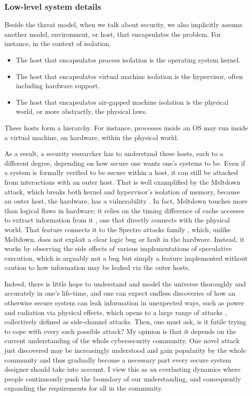 \documentclass[10pt]{article}
\begin{document}
\subsubsection{Low-level system details} \label{sec.low.level}
Beside the threat model, when we talk about security, we also implicitly assume
another model, environment, or host, that encapsulates the problem. For
instance, in the context of isolation, 
\begin{itemize}
	\item The host that encapsulates process isolation is the operating system
		kernel.
	\item The host that encapsulates virtual machine isolation is the
		hypervisor, often including hardware support.
	\item The host that encapsulates air-gapped machine isolation is the
		physical world, or more abstractly, the physical laws.
\end{itemize} 
These hosts form a hierarchy. For instance, processes inside an OS may run
inside a virtual machine, on hardware, within the physical world.

As a result, a security researcher has to understand these hosts, each to a
different degree, depending on how secure one wants one's systems to be. Even if
a system is formally verified to be secure within a host, it can still be
attacked from interactions with an outer host. That is well examplified by
the Meltdown attack, which breaks both kernel and hypervisor's isolation of
memory, because an outer host, the hardware, has a vulnerability
\cite{meltdown}. In fact, Meltdown touches more than logical flaws in hardware;
it relies on the timing difference of cache accesses to extract information
from it \cite{flush.reload}, one that directly connects with the physical
world. That feature connects it to the Spectre attacks family \cite{spectre},
which, unlike Meltdown, does not exploit a clear logic bug or fault in the
hardware. Instead, it works by observing the side effects of various
implementations of speculative execution, which is arguably not a bug but
simply a feature implemented without caution to how information may be leaked
via the outer hosts.

Indeed, there is little hope to understand and model the universe thoroughly
and accurately in one's life-time, and one can expect endless discoveries of
how an otherwise secure system can leak information in unexpected ways, such as
power and radiation via physical effects, which opens to a large range of
attacks \cite{side.channel.1, side.channel.2, side.channel.3, flush.reload},
collectively defined as side-channel attacks.  Then, one must ask, is it futile
trying to cope with every such possible attack? My opinion is that it depends
on the current understanding of the whole cybersecurity community. One novel
attack just discovered may be increasingly understood and gain popularity by
the whole community and thus gradually become a necessary part every secure
system designer should take into account. I view this as an everlasting
dynamics where people continuously push the boundary of our understanding, and
consequently expanding the requirements for all in the community.
\end{document}

